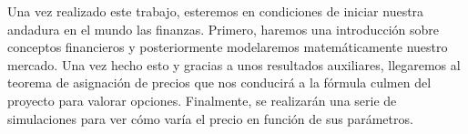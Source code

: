 Una vez realizado este trabajo, esteremos en  condiciones de iniciar nuestra andadura en el mundo las finanzas. Primero, haremos una introducción sobre conceptos financieros y posteriormente modelaremos matemáticamente nuestro mercado. Una vez hecho esto y gracias a unos resultados auxiliares, llegaremos al teorema de asignación de precios que nos conducirá a la fórmula culmen del proyecto para valorar opciones. Finalmente, se realizarán una serie de simulaciones para ver cómo varía el precio en función de sus parámetros.

